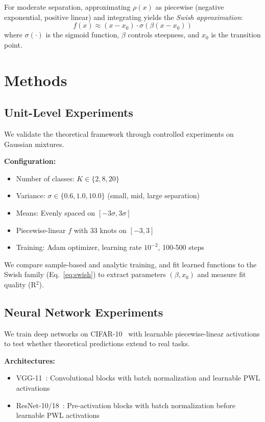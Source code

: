 \documentclass{article}
\begin{document}
For moderate separation, approximating $\rho(x)$ as piecewise (negative exponential, positive linear) and integrating yields the \textit{Swish approximation}:
\begin{equation}
f(x) \approx (x - x_0) \cdot \sigma(\beta(x - x_0))
\label{eq:swish}
\end{equation}
where $\sigma(\cdot)$ is the sigmoid function, $\beta$ controls steepness, and $x_0$ is the transition point.

\section{Methods}
\label{sec:methods}

\subsection{Unit-Level Experiments}

We validate the theoretical framework through controlled experiments on Gaussian mixtures.

\textbf{Configuration:}
\begin{itemize}
\item Number of classes: $K \in \{2, 8, 20\}$
\item Variance: $\sigma \in \{0.6, 1.0, 10.0\}$ (small, mid, large separation)
\item Means: Evenly spaced on $[-3\sigma, 3\sigma]$
\item Piecewise-linear $f$ with 33 knots on $[-3, 3]$
\item Training: Adam optimizer, learning rate $10^{-2}$, 100-500 steps
\end{itemize}

We compare sample-based and analytic training, and fit learned functions to the Swish family (Eq.~\ref{eq:swish}) to extract parameters $(\beta, x_0)$ and measure fit quality (R$^2$).

\subsection{Neural Network Experiments}

We train deep networks on CIFAR-10~\citep{krizhevsky2009cifar} with learnable piecewise-linear activations to test whether theoretical predictions extend to real tasks.

\textbf{Architectures:}
\begin{itemize}
\item VGG-11~\citep{simonyan2014vgg}: Convolutional blocks with batch normalization and learnable PWL activations
\item ResNet-10/18~\citep{he2016resnet}: Pre-activation blocks with batch normalization before learnable PWL activations
\end{itemize}
\end{document}
